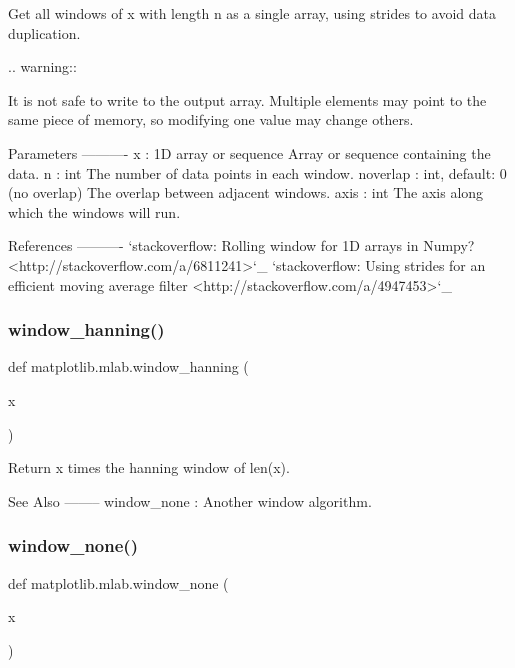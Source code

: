 \begin{DoxyVerb}Get all windows of x with length n as a single array,
using strides to avoid data duplication.

.. warning::

    It is not safe to write to the output array.  Multiple
    elements may point to the same piece of memory,
    so modifying one value may change others.

Parameters
----------
x : 1D array or sequence
    Array or sequence containing the data.
n : int
    The number of data points in each window.
noverlap : int, default: 0 (no overlap)
    The overlap between adjacent windows.
axis : int
    The axis along which the windows will run.

References
----------
`stackoverflow: Rolling window for 1D arrays in Numpy?
<http://stackoverflow.com/a/6811241>`_
`stackoverflow: Using strides for an efficient moving average filter
<http://stackoverflow.com/a/4947453>`_
\end{DoxyVerb}
 \mbox{\label{namespacematplotlib_1_1mlab_a0be4c7ab27102a4d8ceb0a08a32ac0fc}} 
\subsubsection{\texorpdfstring{window\+\_\+hanning()}{window\_hanning()}}
{\footnotesize\ttfamily def matplotlib.\+mlab.\+window\+\_\+hanning (\begin{DoxyParamCaption}\item[{}]{x }\end{DoxyParamCaption})}

\begin{DoxyVerb}Return x times the hanning window of len(x).

See Also
--------
window_none : Another window algorithm.
\end{DoxyVerb}
 \mbox{\label{namespacematplotlib_1_1mlab_acef28ebe480ae1d60bd6b695441873a0}} 
\subsubsection{\texorpdfstring{window\+\_\+none()}{window\_none()}}
{\footnotesize\ttfamily def matplotlib.\+mlab.\+window\+\_\+none (\begin{DoxyParamCaption}\item[{}]{x }\end{DoxyParamCaption})}

